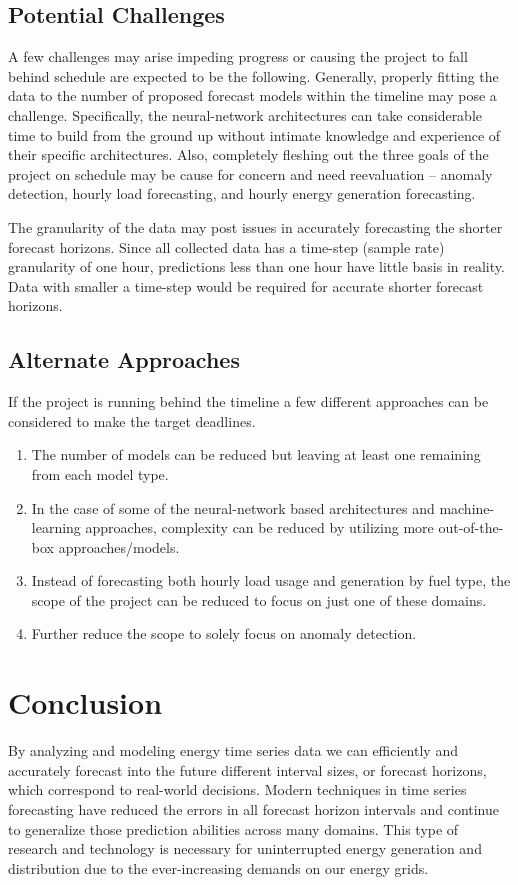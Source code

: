 \documentclass[sigconf]{acmart}
\begin{document}
\subsection{Potential Challenges}
A few challenges may arise impeding progress or causing the project to fall behind schedule are expected to be the following. 
Generally, properly fitting the data to the number of proposed forecast models within the timeline may pose a challenge. Specifically, the neural-network architectures can take considerable time to build from the ground up without intimate knowledge and experience of their specific architectures. Also, completely fleshing out the three goals of the project on schedule may be cause for concern and need reevaluation -- anomaly detection, hourly load forecasting, and hourly energy generation forecasting.

The granularity of the data may post issues in accurately forecasting the shorter forecast horizons. Since all collected data has a time-step (sample rate) granularity of one hour, predictions less than one hour have little basis in reality. Data with smaller a time-step would be required for accurate shorter forecast horizons.

\subsection{Alternate Approaches}
If the project is running behind the timeline a few different approaches can be considered to make the target deadlines. 

\begin{enumerate}
  \item The number of models can be reduced but leaving at least one remaining from each model type. 
  \item In the case of some of the neural-network based architectures and machine-learning approaches, complexity can be reduced by utilizing more out-of-the-box approaches/models. 
  \item Instead of forecasting both hourly load usage and generation by fuel type, the scope of the project can be reduced to focus on just one of these domains.
  \item Further reduce the scope to solely focus on anomaly detection.
\end{enumerate}

\section{Conclusion}
By analyzing and modeling energy time series data we can efficiently and accurately forecast into the future different interval sizes, or forecast horizons, which correspond to real-world decisions. Modern techniques in time series forecasting have reduced the errors in all forecast horizon intervals and continue to generalize those prediction abilities across many domains. This type of research and technology is necessary for uninterrupted energy generation and distribution due to the ever-increasing demands on our energy grids.
\end{document}
